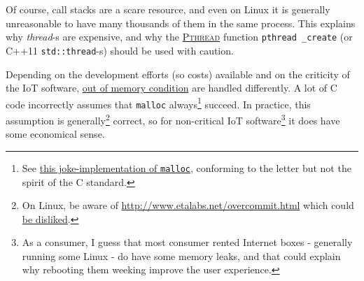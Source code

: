  Of course, call stacks are a scare resource, and even on Linux it is
 generally unreasonable to have many thousands of them in the same
 process. This explains why  \emph{thread}-s are
 expensive, and why the 
 \href{https://computing.llnl.gov/tutorials/pthreads/}{\textsc{Pthread}}
 function \texttt{pthread \_create} (or C++11 \texttt{std::thread}-s)
 should be used with caution.

 Depending on the development efforts (so costs) available and on the
 criticity of the IoT software,
 \href{https://en.wikipedia.org/wiki/Out_of_memory}{out of memory
   condition}  are handled differently. A lot of
 C code incorrectly assumes that \texttt{malloc} always\footnote{See
   \href{https://stackoverflow.com/a/8460584/841108}{this
     joke-implementation of \texttt{malloc}}, conforming to the letter
   but not the spirit of the C standard.} succeed. In practice, this
 assumption is generally\footnote{On Linux, be aware of \href{memory
     overcommit}{http://www.etalabs.net/overcommit.html} which could
   \href{https://unix.stackexchange.com/q/441364/50557}{be disliked}.}
 correct, so for non-critical IoT software\footnote{As a consumer, I
   guess that most consumer rented Internet boxes - generally running
   some Linux - do have some memory leaks, and that could explain why
   rebooting them weeking improve the user experience.} it does have
 some economical sense.
 
\bigskip




